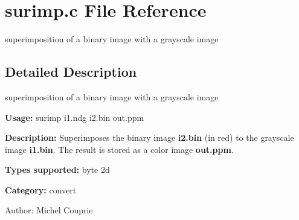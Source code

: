 \section{surimp.c File Reference}
\label{surimp_8c}
superimposition of a binary image with a grayscale image  




\label{_details}
\subsection{Detailed Description}
superimposition of a binary image with a grayscale image 

{\bf Usage:} surimp i1.ndg i2.bin out.ppm

{\bf Description:} Superimposes the binary image {\bf i2.bin} (in red) to the grayscale image {\bf i1.bin}. The result is stored as a color image {\bf out.ppm}.

{\bf Types supported:} byte 2d

{\bf Category:} convert

\begin{Desc}
\item[Author:]Michel Couprie \end{Desc}

